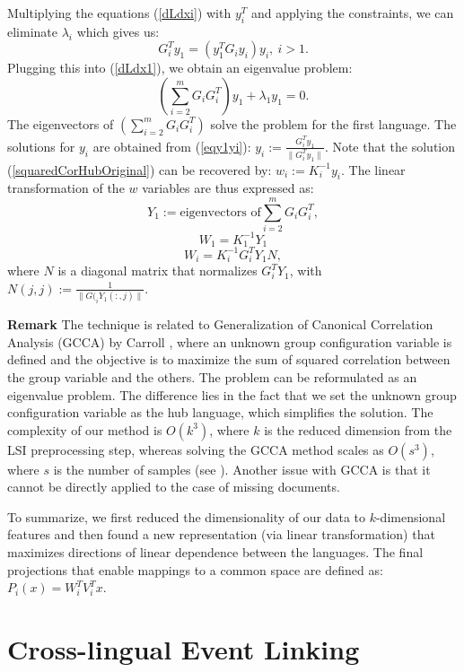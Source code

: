 \documentclass[twoside,11pt]{article}
\begin{document}
Multiplying the equations (\ref{dLdxi}) with $y_i^T$ and applying the constraints, we can eliminate $\lambda_i$ which gives us:
\begin{equation}\label{eqy1yi}
G_{i}^T y_1 = \left(y_1^T G_{i} y_i \right) y_i,~i > 1.
\end{equation}
Plugging this into (\ref{dLdx1}), we obtain an eigenvalue problem:
$$\left( \sum_{i = 2}^m G_i G_{i}^T \right) y_1 + \lambda_1 y_1 = 0.$$
The eigenvectors of $\left( \sum_{i = 2}^m G_i G_{i}^T \right)$ solve the problem for the first language. The solutions for $y_i$ are obtained from (\ref{eqy1yi}): $y_i := \frac{G_{i}^T y_1}{\| G_{i}^T y_1 \|}$.
Note that the solution (\ref{squaredCorHubOriginal}) can be recovered by: $w_i := K_i^{-1} y_i$. The linear transformation of the $w$ variables are thus expressed as:
$$ Y_1 := \text{eigenvectors of} \sum_{i = 2}^m G_i G_{i}^T, $$
$$ W_1 = K_1^{-1} Y_1 $$
$$ W_i = K_i^{-1} G_{i}^T Y_1 N,$$
where $N$ is a diagonal matrix that normalizes $G_{i}^T Y_1$, with $N(j,j) := \frac{1}{\|G(_{i} Y_1(:,j)\|}$.

\textbf{Remark}
 The technique is related to  Generalization of Canonical Correlation Analysis (GCCA) by Carroll \citeyear{Carroll}, where an unknown group configuration variable is defined and the objective is to maximize the sum of squared correlation between the group variable and the others. The problem can be reformulated as an eigenvalue problem. The difference lies in the fact that we set the unknown group configuration variable as the hub language, which simplifies the solution. The complexity of our method is $O(k^3)$, where $k$ is the reduced dimension from the LSI preprocessing step, whereas solving the GCCA method scales as $O(s^3)$, where $s$ is the number of samples (see \cite{gifi}). Another issue with GCCA is that it cannot be directly applied to the case of missing documents.

To summarize, we first reduced the dimensionality of our data to $k$-dimensional features and then found a new representation (via linear transformation) that maximizes directions of linear dependence between the languages. The final projections that enable mappings to a common space are defined as: $P_i(x) = W_i^T V_i^T x.$


\section{Cross-lingual Event Linking}\label{sec:linking}
\end{document}
